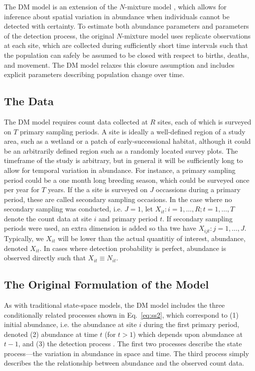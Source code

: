\documentclass[12pt]{article}
\begin{document}
The DM model is an extension of the $N$-mixture model
\citep{royle:2004biom}, which allows for inference about spatial
variation in abundance when individuals cannot be detected with
certainty. To estimate both abundance parameters and parameters of the
detection process, the original $N$-mixture model uses replicate
observations at each site, which are collected during sufficiently
short time intervals such that the population can safely be assumed to
be closed with respect to births, deaths, and movement. The DM model
relaxes this closure assumption and includes explicit parameters
describing population change over time.


\subsection{The Data}

The DM model requires count data collected at $R$ sites, each of which
is surveyed on $T$ primary sampling periods. A site is ideally a
well-defined region of a study area, such as a wetland or a patch of
early-successional habitat, although it could be an arbitrarily
defined region such as a randomly located
survey plots. The timeframe of the study is arbitrary, but in general
it will be sufficiently long to allow for temporal variation in
abundance. For instance, a primary sampling period could be a one
month long breeding season, which could be surveyed once per year for
$T$ years. If the a site is surveyed on $J$ occassions during a
primary period, these are called secondary sampling occasions.
In the case where no secondary sampling was conducted, i.e. $J=1$,
let $X_{it}: i=1,\hdots,R; t=1,\hdots,T$ denote the count data at site
$i$ and primary period $t$. If secondary sampling periods were used,
an extra dimension is added so tha twe have $X_{ijt}:
j=1,\hdots,J$. Typically, we $X_{it}$ will be lower than the actual
quantitiy of interest, abundance,
denoted $X_{it}$. In cases where detection probability is perfect,
abundance is observed directly such that $X_{it} \equiv N_{it}$.

\subsection{The Original Formulation of the Model}

As with traditional state-space models, the DM model includes the
three conditionally related processes shown in Eq.~\ref{eq:ss2}, which
correspond to (1) initial abundance, i.e. the
abundance at site $i$ during the first primary period,
denoted (2) abundance at time $t$ (for $t>1$) which depends upon
abundance at $t-1$, and (3) the
detection process \citep{dail_madsen:2011}.
The first two processes describe the state process---the
variation in abundance in space and time. The third process simply
describes the the relationship between
abundance and the observed count data.
\end{document}
